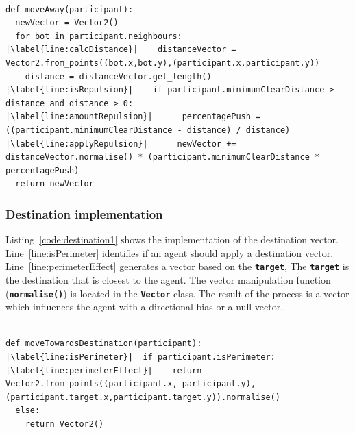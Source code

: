 \lstset{language=Python,
basicstyle=\tiny,
numbers=left, 
numberstyle=\tiny,
captionpos=b,
frame=single,
breaklines=true,
caption=Repulsion code,
escapechar=|
} %
\begin{lstlisting}[label={code:repulsion1}]  % Start your code-block

def moveAway(participant):
  newVector = Vector2()
  for bot in participant.neighbours:
|\label{line:calcDistance}|    distanceVector = Vector2.from_points((bot.x,bot.y),(participant.x,participant.y))
    distance = distanceVector.get_length()
|\label{line:isRepulsion}|    if participant.minimumClearDistance > distance and distance > 0:
|\label{line:amountRepulsion}|      percentagePush = ((participant.minimumClearDistance - distance) / distance)
|\label{line:applyRepulsion}|      newVector += distanceVector.normalise() * (participant.minimumClearDistance * percentagePush)
  return newVector
\end{lstlisting}

\subsubsection{Destination implementation}
Listing~\ref{code:destination1} shows the implementation of the destination vector. Line~\ref{line:isPerimeter} identifies if an agent should apply a destination vector. Line~\ref{line:perimeterEffect} generates a vector based on the \texttt{\textbf{target}}, The \texttt{\textbf{target}} is the destination that is closest to the agent. The vector manipulation function (\texttt{\textbf{normalise()}}) is located in the \texttt{\textbf{Vector}} class. The result of the process is a vector which influences the agent with a directional bias or a null vector.

\lstset{language=Python,
basicstyle=\tiny,
numbers=left, 
numberstyle=\tiny,
captionpos=b,
frame=single,
breaklines=true,
caption=Repulsion code,
escapechar=|
} %
\begin{lstlisting}[label={code:destination1}]  % Start your code-block

def moveTowardsDestination(participant):
|\label{line:isPerimeter}|  if participant.isPerimeter:
|\label{line:perimeterEffect}|    return Vector2.from_points((participant.x, participant.y),(participant.target.x,participant.target.y)).normalise()
  else:
    return Vector2()
\end{lstlisting}

